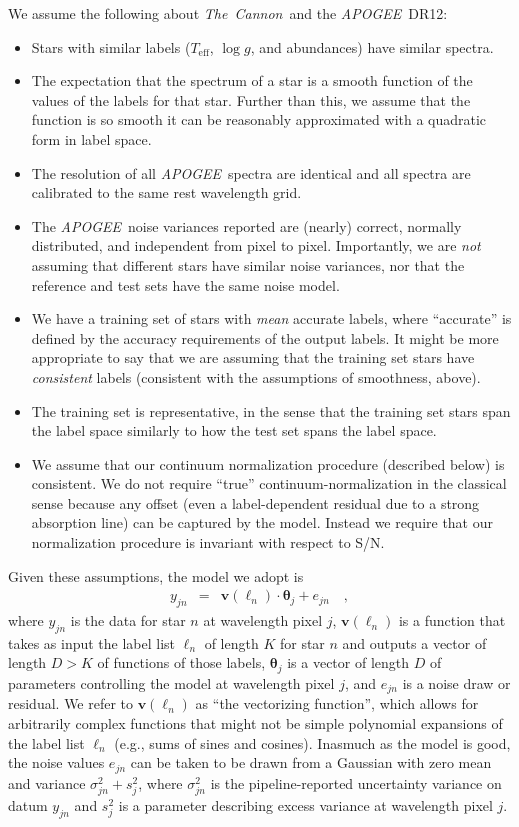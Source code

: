 \documentclass[12pt,preprint]{aastex}
\newcommand{\project}[1]{\textsl{#1}}
\newcommand{\TheCannon}{\project{The~Cannon}}
\newcommand{\acronym}[1]{{\small{#1}}}
\newcommand{\apogee}{\project{\acronym{APOGEE}}}
\newcommand{\dr}{\acronym{DR12}}
\newcommand{\logg}{\log g}
\newcommand{\Teff}{T_{\mathrm{eff}}}
\newcommand{\Dvector}[1]{\boldsymbol{#1}}
\newcommand{\vectheta}{\Dvector{\theta}}
\newcommand{\vecv}{\Dvector{v}}
\begin{document}
\noindent{}We assume the following about \TheCannon\ and the \apogee\ \dr:
\begin{itemize}
\item
Stars with similar labels ($\Teff$, $\logg$, and abundances) have similar spectra.
\item
The expectation that the spectrum of a star is a smooth function of the values of 
the labels for that star.  Further than this, we assume that the function is so 
smooth it can be reasonably approximated with a quadratic form in label space.
\item
The resolution of all \apogee\ spectra are identical and all spectra are calibrated
to the same rest wavelength grid.
\item
The \apogee\ noise variances reported are (nearly) correct, normally distributed,
and independent from pixel to pixel.  
Importantly, we are \emph{not} assuming that different stars have similar noise
variances, nor that the reference and test sets have the same noise model.
\item
We have a training set of stars with \emph{mean} accurate labels, where ``accurate'' is 
defined by the accuracy requirements of the output labels.  It might be more 
appropriate to say that we are assuming that the training set stars have 
\emph{consistent} labels (consistent with the assumptions of smoothness, above).
\item
The training set is representative, in the sense that the training set stars 
span the label space similarly to how the test set spans the label
space.
\item
We assume that our continuum normalization procedure (described below) is consistent.
We do not require ``true'' continuum-normalization in the classical sense 
because any offset (even a label-dependent residual due to a strong absorption
line) can be captured by the model.  Instead we require that our normalization
procedure is invariant with respect to S/N.
\end{itemize}


\noindent{}Given these assumptions, the model we adopt is
\begin{eqnarray}
  y_{jn} &=& \vecv(\ell_n)\cdot\vectheta_j + e_{jn}
  \label{eq:model}\quad ,
\end{eqnarray}
where $y_{jn}$ is the data for star $n$ at wavelength pixel $j$, $\vecv(\ell_n)$
is a function that takes as input the label list $\ell_n$ of length $K$ for star
$n$ and outputs a vector of length $D>K$ of functions of those labels,
$\vectheta_j$ is a vector of length $D$ of parameters controlling the model at 
wavelength pixel $j$, and $e_{jn}$ is a noise draw or residual.  We refer to 
$\vecv(\ell_n)$ as ``the vectorizing function'', which allows for arbitrarily 
complex functions that might not be simple polynomial expansions of the label 
list $\ell_n$ (e.g., sums of sines and cosines).  Inasmuch as the model is good,
the noise values $e_{jn}$ can be taken to be drawn from a Gaussian with zero 
mean and variance $\sigma^2_{jn}+s^2_j$, where $\sigma^2_{jn}$ is the 
pipeline-reported uncertainty variance on datum $y_{jn}$ and $s^2_j$ is a 
parameter describing excess variance at wavelength pixel $j$.
\end{document}
